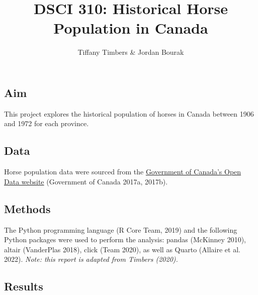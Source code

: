 \documentclass[
  letterpaper,
  DIV=11,
  numbers=noendperiod]{scrartcl}
\title{DSCI 310: Historical Horse Population in Canada}
\author{Tiffany Timbers \& Jordan Bourak}
\date{}
\renewcommand*\contentsname{Table of contents}
\newcommand\contentsname{Table of contents}
\begin{document}
\maketitle
\ifdefined\Shaded\renewenvironment{Shaded}{\begin{tcolorbox}[interior hidden, frame hidden, borderline west={3pt}{0pt}{shadecolor}, enhanced, boxrule=0pt, breakable, sharp corners]}{\end{tcolorbox}}\fi

\renewcommand*\contentsname{Table of contents}
{
\hypersetup{linkcolor=}
\setcounter{tocdepth}{2}
\tableofcontents
}
\hypertarget{aim}{%
\subsection{Aim}\label{aim}}

This project explores the historical population of horses in Canada
between 1906 and 1972 for each province.

\hypertarget{data}{%
\subsection{Data}\label{data}}

Horse population data were sourced from the
\href{http://open.canada.ca/en/open-data}{Government of Canada's Open
Data website} (Government of Canada 2017a, 2017b).

\hypertarget{methods}{%
\subsection{Methods}\label{methods}}

The Python programming language (R Core Team, 2019) and the following
Python packages were used to perform the analysis: pandas (McKinney
2010), altair (VanderPlas 2018), click (Team 2020), as well as Quarto
(Allaire et al. 2022). \emph{Note: this report is adapted from Timbers
(2020).}

\hypertarget{results}{%
\subsection{Results}\label{results}}
\end{document}
